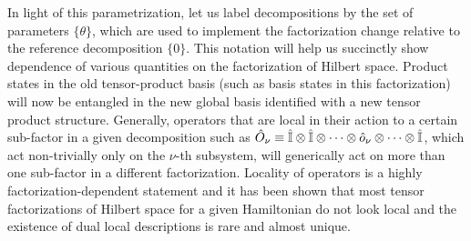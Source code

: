 \documentclass[aps,pra,onecolumn,nofootinbib,notitlepage,11pt,tightenlines]{revtex4-1}
\begin{document}
In light of this parametrization, let us label decompositions by the set of parameters $\{\theta \}$, which are used to implement the factorization change relative to the reference decomposition $\{0\}$. This notation will help us succinctly show dependence of various quantities on the factorization of Hilbert space. Product states in the old tensor-product basis (such as basis states in this factorization) will now be entangled in the new global basis identified with a new tensor product structure. Generally, operators that are local in their action to a certain sub-factor in a given decomposition such as $\hat{O}_{\nu} \equiv \hat{\mathbb{I}} \otimes \hat{\mathbb{I}} \otimes \cdots \otimes \hat{o}_{\nu} \otimes \cdots  \otimes \hat{\mathbb{I}}$, which act non-trivially only on the $\nu$-th subsystem, will generically act on more than one sub-factor in a different factorization. Locality of operators is a highly factorization-dependent statement and it has been shown \cite{cotler2019locality} that most tensor factorizations of Hilbert space for a given Hamiltonian do not look local and the existence of dual local descriptions is rare and almost unique.
\end{document}
